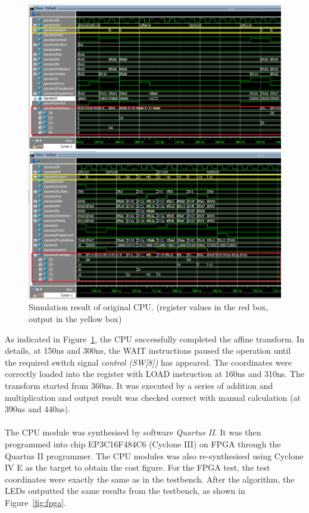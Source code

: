 \begin{figure}[H]
		\centering
		\includegraphics[width = \textwidth]{Figures/original_CPU}		
		\caption{Simulation result of original CPU. (register values in the red box, output in the yellow box)}
		\label {fig:ocpu}
\end{figure}

As indicated in Figure~\ref{fig:ocpu}, the CPU successfully completed the affine transform. In details, at 150ns and 300ns, the WAIT instructions paused the operation until the required switch signal \textit{control (SW[8])} has appeared. The coordinates were correctly loaded into the register with LOAD instruction at 160ns and 310ns. The transform started from 360ns. It was executed by a series of addition and multiplication and output result was checked correct with manual calculation (at 390ns and 440ns).\\\\
The CPU module was synthesised by software \textit{Quartus II}. It was then programmed into chip EP3C16F484C6 (Cyclone III) on FPGA through the Quartus II programmer. The CPU modules was also re-synthesised using Cyclone IV E as the target to obtain the cost figure. For the FPGA test, the test coordinates were exactly the same as in the testbench. After the algorithm, the LEDs outputted the same results from the testbench, as shown in Figure~\ref{fig:fpga}.

